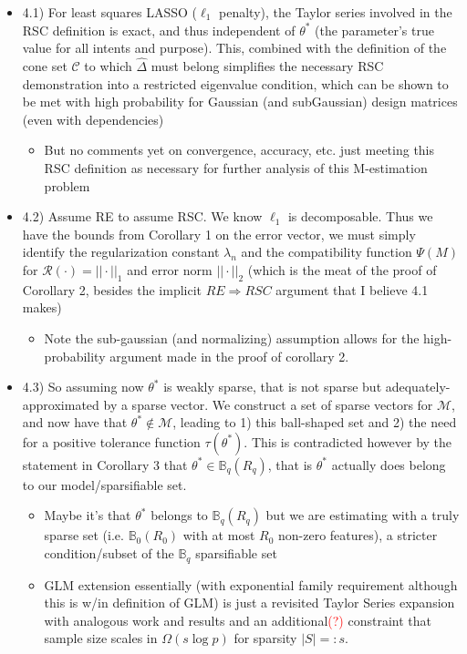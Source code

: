 \documentclass[11pt]{article}
\begin{document}
\begin{itemize}
	\item 4.1) For least squares LASSO ($\ell_1$ penalty), the Taylor series involved in the RSC definition is exact, and thus independent of $\theta^*$ (the parameter's true value for all intents and purpose). This, combined with the definition of the cone set $\mathcal{C}$ to which $\hat{\Delta}$ must belong simplifies the necessary RSC demonstration into a restricted eigenvalue condition, which can be shown to be met with high probability for Gaussian (and subGaussian) design matrices (even with dependencies)
    \begin{itemize}
        \item But no comments yet on convergence, accuracy, etc. just meeting this RSC definition as necessary for further analysis of this M-estimation problem 
    \end{itemize}
    \item 4.2) Assume RE to assume RSC. We know $\ell_1$ is decomposable. Thus we have the bounds from Corollary 1 on the error vector, we must simply identify the regularization constant $\lambda_n$ and the compatibility function $\Psi(M)$ for $\mathcal{R}(\cdot) = ||\cdot||_1$ and error norm $||\cdot||_2$ (which is the meat of the proof of Corollary 2, besides the implicit $RE \Rightarrow RSC$ argument that I believe 4.1 makes)
		\begin{itemize}
            \item Note the sub-gaussian (and normalizing) assumption allows for the high-probability argument made in the proof of corollary 2. 
        \end{itemize}
	\item 4.3) So assuming now $\theta^*$ is weakly sparse, that is not sparse but adequately-approximated by a sparse vector. We construct a set of sparse vectors for $\mathcal{M}$, and now have that $\theta^* \not\in \mathcal{M}$, leading to 1) this ball-shaped set and 2) the need for a positive tolerance function $\tau(\theta^*)$. This is contradicted however by the statement in Corollary 3 that $\theta^* \in \mathbb{B}_q(R_q)$, that is $\theta^*$ actually does belong to our model/sparsifiable set. 
	\begin{itemize}
        \item Maybe it's that $\theta^*$ belongs to $\mathbb{B}_q(R_q)$ but we are estimating with a truly sparse set (i.e. $\mathbb{B}_0(R_0)$ with at most $R_0$ non-zero features), a stricter condition/subset of the $\mathbb{B}_q$ sparsifiable set 
        \item GLM extension essentially (with exponential family requirement although this is w/in definition of GLM) is just a revisited Taylor Series expansion with analogous work and results and an additional\textcolor{red}{(?)} constraint that sample size scales in $\Omega(s \log p)$ for sparsity $|S|=:s$.
    \end{itemize}
\end{itemize}
\end{document}
